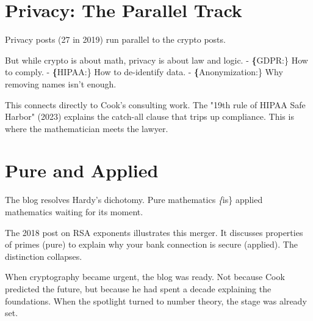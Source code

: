 \bigskip

\section*{Privacy: The Parallel Track}

Privacy posts (27 in 2019) run parallel to the crypto posts.

But while crypto is about math, privacy is about law and logic.
- \textbf\{GDPR:\} How to comply.
- \textbf\{HIPAA:\} How to de-identify data.
- \textbf\{Anonymization:\} Why removing names isn't enough.

This connects directly to Cook's consulting work. The "19th rule of HIPAA Safe Harbor" (2023) explains the catch-all clause that trips up compliance. This is where the mathematician meets the lawyer.

\bigskip

\section*{Pure and Applied}

The blog resolves Hardy's dichotomy. Pure mathematics \textit\{is\} applied mathematics waiting for its moment.

The 2018 post on RSA exponents illustrates this merger. It discusses properties of primes (pure) to explain why your bank connection is secure (applied). The distinction collapses.

When cryptography became urgent, the blog was ready. Not because Cook predicted the future, but because he had spent a decade explaining the foundations. When the spotlight turned to number theory, the stage was already set.
